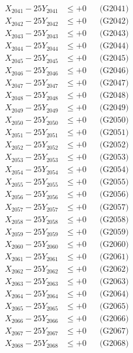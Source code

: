 \documentclass[a4paper,10pt]{article}
\begin{document}
{\begin{align}
X_{2041} - 25Y_{2041} &\leq +0 && \text{(G2041)} \\
X_{2042} - 25Y_{2042} &\leq +0 && \text{(G2042)} \\
X_{2043} - 25Y_{2043} &\leq +0 && \text{(G2043)} \\
X_{2044} - 25Y_{2044} &\leq +0 && \text{(G2044)} \\
X_{2045} - 25Y_{2045} &\leq +0 && \text{(G2045)} \\
X_{2046} - 25Y_{2046} &\leq +0 && \text{(G2046)} \\
X_{2047} - 25Y_{2047} &\leq +0 && \text{(G2047)} \\
X_{2048} - 25Y_{2048} &\leq +0 && \text{(G2048)} \\
X_{2049} - 25Y_{2049} &\leq +0 && \text{(G2049)} \\
X_{2050} - 25Y_{2050} &\leq +0 && \text{(G2050)} \\
\allowbreak
X_{2051} - 25Y_{2051} &\leq +0 && \text{(G2051)} \\
X_{2052} - 25Y_{2052} &\leq +0 && \text{(G2052)} \\
X_{2053} - 25Y_{2053} &\leq +0 && \text{(G2053)} \\
X_{2054} - 25Y_{2054} &\leq +0 && \text{(G2054)} \\
X_{2055} - 25Y_{2055} &\leq +0 && \text{(G2055)} \\
X_{2056} - 25Y_{2056} &\leq +0 && \text{(G2056)} \\
X_{2057} - 25Y_{2057} &\leq +0 && \text{(G2057)} \\
X_{2058} - 25Y_{2058} &\leq +0 && \text{(G2058)} \\
X_{2059} - 25Y_{2059} &\leq +0 && \text{(G2059)} \\
X_{2060} - 25Y_{2060} &\leq +0 && \text{(G2060)} \\
\allowbreak
X_{2061} - 25Y_{2061} &\leq +0 && \text{(G2061)} \\
X_{2062} - 25Y_{2062} &\leq +0 && \text{(G2062)} \\
X_{2063} - 25Y_{2063} &\leq +0 && \text{(G2063)} \\
X_{2064} - 25Y_{2064} &\leq +0 && \text{(G2064)} \\
X_{2065} - 25Y_{2065} &\leq +0 && \text{(G2065)} \\
X_{2066} - 25Y_{2066} &\leq +0 && \text{(G2066)} \\
X_{2067} - 25Y_{2067} &\leq +0 && \text{(G2067)} \\
X_{2068} - 25Y_{2068} &\leq +0 && \text{(G2068)} \\

\end{align}}
\end{document}
